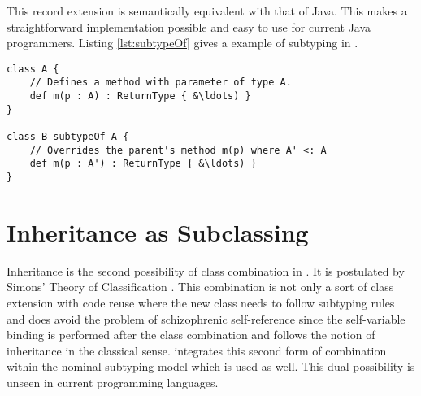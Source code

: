 This record extension is semantically equivalent with that of Java. This
makes a straightforward implementation possible and easy to use for
current Java programmers. Listing \ref{lst:subtypeOf} gives a example
of subtyping in \ooplss.

\begin{lstlisting}[language=ooplss,caption=Subtyping in \ooplss,label=lst:subtypeOf]
class A {
	// Defines a method with parameter of type A.
	def m(p : A) : ReturnType { &\ldots) }
}

class B subtypeOf A {
	// Overrides the parent's method m(p) where A' <: A
	def m(p : A') : ReturnType { &\ldots) }
}
\end{lstlisting}


%
%
%
%

\section{Inheritance as Subclassing}
Inheritance is the second possibility of class combination in \ooplss. It
is postulated by Simons' Theory of Classification \cite{simons_theory_2004-2}.
This combination is not only a sort of class extension with code reuse where
the new class needs to follow subtyping rules and does avoid the problem of
schizophrenic self-reference since the self-variable binding is performed after
the class combination and follows the notion of inheritance in the
classical sense. \ooplss integrates this second form of combination within
the nominal subtyping model which is used as well. This dual possibility is
unseen in current programming languages.

